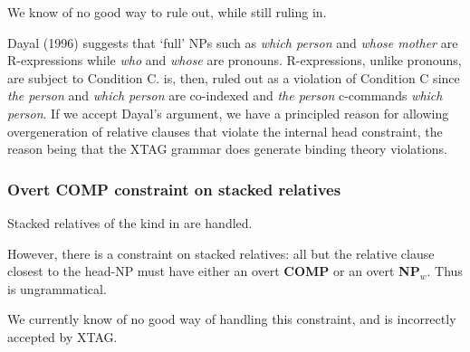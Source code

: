 \enumsentence{the person [ who$_{i}$ Muriel likes $\epsilon_i$ ]]}
\enumsentence{*the person [[which person ]$_{i}$ Muriel likes $\epsilon_i$ ]]}

We know of no good way to rule  out, while still ruling  in.
\enumsentence{the person [[whose mother ]$_{i}$ Muriel likes $\epsilon_i$ ]]}

Dayal (1996) suggests that `full' NPs such as {\em which person} and
{\em whose mother} are R-expressions while {\em who} and {\em whose}
are pronouns. R-expressions, unlike pronouns, are subject to Condition C.
 is, then, ruled out as a violation of Condition C since {\em 
the person} and {\em which person} are co-indexed and {\em the person}
c-commands {\em which person}. If we accept Dayal's argument, we 
have a principled reason for allowing overgeneration of relative clauses
that violate the internal head constraint, the reason being that 
the XTAG grammar does generate binding theory violations.

\subsubsection{Overt COMP constraint on stacked relatives}
Stacked relatives of the kind in  are handled.


However, there is a constraint on stacked relatives: all but the relative
clause closest to the head-NP must have either an overt {\bf COMP} or an
overt {\bf NP$_{w}$}. Thus  is ungrammatical.


We currently know of no good way of handling this constraint, and  is
incorrectly accepted by XTAG.
